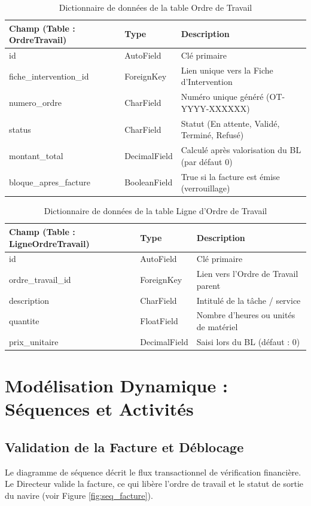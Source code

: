 \documentclass[12pt,a4paper,oneside]{report}
\begin{document}
\begin{table}[H]
\centering
\small
\begin{tabular}{lll}
\toprule
\textbf{Champ (Table : OrdreTravail)} & \textbf{Type} & \textbf{Description} \\
\midrule
id & AutoField & Clé primaire \\
fiche\_intervention\_id & ForeignKey & Lien unique vers la Fiche d'Intervention \\
numero\_ordre & CharField & Numéro unique généré (OT-YYYY-XXXXXX) \\
status & CharField & Statut (En attente, Validé, Terminé, Refusé) \\
montant\_total & DecimalField & Calculé après valorisation du BL (par défaut 0) \\
bloque\_apres\_facture & BooleanField & True si la facture est émise (verrouillage) \\
\bottomrule
\end{tabular}
\caption{Dictionnaire de données de la table Ordre de Travail}
\label{tab:dict_ot}
\end{table}

\begin{table}[H]
\centering
\small
\begin{tabular}{lll}
\toprule
\textbf{Champ (Table : LigneOrdreTravail)} & \textbf{Type} & \textbf{Description} \\
\midrule
id & AutoField & Clé primaire \\
ordre\_travail\_id & ForeignKey & Lien vers l'Ordre de Travail parent \\
description & CharField & Intitulé de la tâche / service \\
quantite & FloatField & Nombre d'heures ou unités de matériel \\
prix\_unitaire & DecimalField & Saisi lors du BL (défaut : 0) \\
\bottomrule
\end{tabular}
\caption{Dictionnaire de données de la table Ligne d'Ordre de Travail}
\label{tab:dict_lignes}
\end{table}

\section{Modélisation Dynamique : Séquences et Activités}
\subsection{Validation de la Facture et Déblocage}
Le diagramme de séquence décrit le flux transactionnel de vérification financière. Le Directeur valide la facture, ce qui libère l'ordre de travail et le statut de sortie du navire (voir Figure \ref{fig:seq_facture}).
\end{document}
